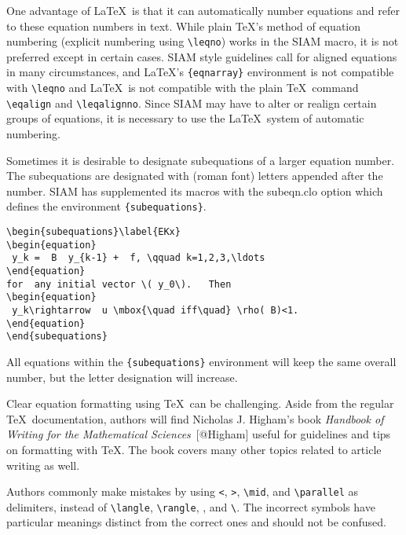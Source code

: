 \documentclass[]{article}
\begin{document}
One advantage of LaTeX~is that it can automatically number equations and
refer to these equation numbers in text. While plain TeX's method of
equation numbering (explicit numbering using
\texttt{\textbackslash{}leqno}) works in the SIAM macro, it is not
preferred except in certain cases. SIAM style guidelines call for
aligned equations in many circumstances, and LaTeX's
\texttt{\{eqnarray\}} environment is not compatible with
\texttt{\textbackslash{}leqno} and LaTeX~is not compatible with the
plain TeX~command \texttt{\textbackslash{}eqalign} and
\texttt{\textbackslash{}leqalignno}. Since SIAM may have to alter or
realign certain groups of equations, it is necessary to use the
LaTeX~system of automatic numbering.

Sometimes it is desirable to designate subequations of a larger equation
number. The subequations are designated with (roman font) letters
appended after the number. SIAM has supplemented its macros with the
{subeqn.clo} option which defines the environment
\texttt{\{subequations\}}.

\begin{verbatim}
\begin{subequations}\label{EKx}
\begin{equation}
 y_k =  B  y_{k-1} +  f, \qquad k=1,2,3,\ldots  
\end{equation}
for  any initial vector \( y_0\).   Then 
\begin{equation}
 y_k\rightarrow  u \mbox{\quad iff\quad} \rho( B)<1.
\end{equation}
\end{subequations}
\end{verbatim}

All equations within the \texttt{\{subequations\}} environment will keep
the same overall number, but the letter designation will increase.

Clear equation formatting using TeX~can be challenging. Aside from the
regular TeX~documentation, authors will find Nicholas J. Higham's book
{\emph{Handbook of Writing for the Mathematical Sciences}}~{[}@Higham{]}
useful for guidelines and tips on formatting with TeX. The book covers
many other topics related to article writing as well.

Authors commonly make mistakes by using \texttt{\textless{}},
\texttt{\textgreater{}}, \texttt{\textbackslash{}mid}, and
\texttt{\textbackslash{}parallel} as delimiters, instead of
\texttt{\textbackslash{}langle}, \texttt{\textbackslash{}rangle},
\texttt{\textbar{}}, and \texttt{\textbackslash{}\textbar{}}. The
incorrect symbols have particular meanings distinct from the correct
ones and should not be confused.
\end{document}
